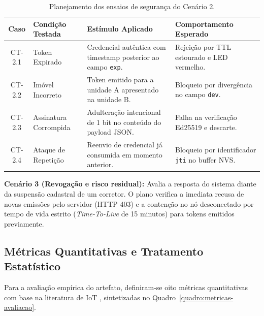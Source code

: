 \begin{table}[htbp]
\centering
\footnotesize
\caption{Planejamento dos ensaios de segurança do Cenário 2.}
\label{quadro:cenario-2-testes}
\begin{tabularx}{\textwidth}{c p{3.2cm} X p{3.6cm}}
\toprule
\textbf{Caso} & \textbf{Condição Testada} & \textbf{Estímulo Aplicado} & \textbf{Comportamento Esperado} \\
\midrule
CT-2.1 & Token Expirado & Credencial autêntica com timestamp posterior ao campo \texttt{exp}. & Rejeição por TTL estourado e LED vermelho. \\
CT-2.2 & Imóvel Incorreto & Token emitido para a unidade A apresentado na unidade B. & Bloqueio por divergência no campo \texttt{dev}. \\
CT-2.3 & Assinatura Corrompida & Adulteração intencional de 1 bit no conteúdo do payload JSON. & Falha na verificação Ed25519 e descarte. \\
CT-2.4 & Ataque de Repetição & Reenvio de credencial já consumida em momento anterior. & Bloqueio por identificador \texttt{jti} no buffer NVS. \\
\bottomrule
\end{tabularx}
\end{table}

\label{subsec:cenario-3}
\textbf{Cenário 3 (Revogação e risco residual):} Avalia a resposta do sistema diante da suspensão cadastral de um corretor. O plano verifica a imediata recusa de novas emissões pelo servidor (HTTP 403) e a contenção no nó desconectado por tempo de vida estrito (\textit{Time-To-Live} de 15 minutos) para tokens emitidos previamente.

\subsection{Métricas Quantitativas e Tratamento Estatístico}
\label{sec:metricas-avaliacao}
\label{subsec:variaveis-metricas}

Para a avaliação empírica do artefato, definiram-se oito métricas quantitativas com base na literatura de IoT \cite{ameer2022,vardakis2024,simperf2024}, sintetizadas no Quadro~\ref{quadro:metricas-avaliacao}.

